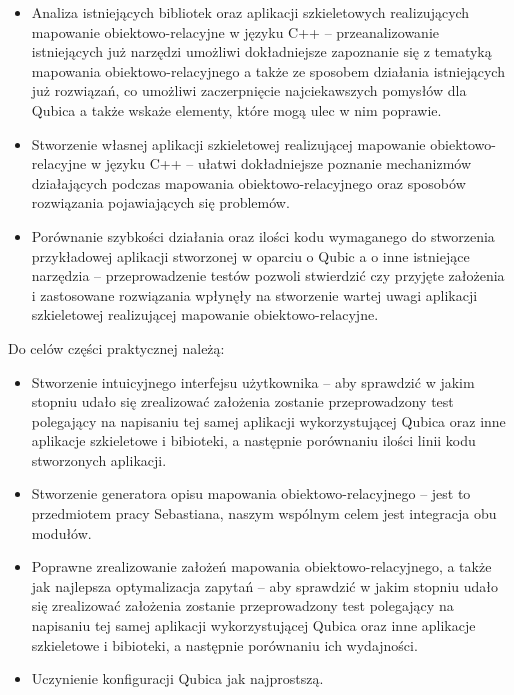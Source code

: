 \documentclass[12pt]{report}
\begin{document}
\begin{itemize}
\item Analiza istniejących bibliotek oraz aplikacji szkieletowych realizujących ma\-po\-wa\-nie obiektowo-relacyjne w języku C++ -- przeanalizowanie istniejących już narzędzi
umożliwi dokładniejsze zapoznanie się z tematyką mapowania obiektowo-relacyjnego a także ze sposobem działania istniejących już rozwiązań, co umożliwi zaczerpnięcie 
najciekawszych pomysłów dla Qubica a także wskaże elementy, które mogą ulec w nim poprawie.
\item Stworzenie własnej aplikacji szkieletowej realizującej mapowanie obiektowo-relacyjne w języku C++ -- ułatwi dokładniejsze poznanie mechanizmów dzia\-łających
podczas mapowania obiektowo-relacyjnego oraz sposobów ro\-zwią\-zania pojawiających się problemów.

\item Porównanie szybkości działania oraz ilości kodu wymaganego do stworzenia przykładowej aplikacji stworzonej w oparciu o Qubic a o inne istniejące na\-rzędzia -- 
przeprowadzenie testów pozwoli stwierdzić czy przyjęte założenia i zastosowane rozwiązania wpłynęły na stworzenie wartej uwagi aplikacji szkieletowej realizującej
mapowanie obiektowo-relacyjne.
\end{itemize}

Do celów części praktycznej należą:

\begin{itemize}
\item Stworzenie intuicyjnego interfejsu użytkownika -- aby sprawdzić w jakim stopniu udało się zrealizować założenia zostanie przeprowadzony test po\-le\-ga\-ją\-cy na 
napisaniu tej samej aplikacji wykorzystującej Qubica oraz inne aplikacje szkieletowe i bibioteki, a następnie porównaniu ilości linii kodu stworzonych aplikacji.
\item Stworzenie generatora opisu mapowania obiektowo-relacyjnego -- jest to przed\-mio\-tem pracy Sebastiana, naszym wspólnym celem jest integracja obu modułów.
\item Poprawne zrealizowanie założeń mapowania obiektowo-relacyjnego, a także jak najlepsza optymalizacja zapytań -- aby sprawdzić w jakim stopniu udało się zrealizować
założenia zostanie przeprowadzony test polegający na napisaniu tej samej aplikacji wykorzystującej Qubica oraz inne aplikacje szkieletowe i bibioteki, a następnie porównaniu
ich wydajności.
\item Uczynienie konfiguracji Qubica jak najprostszą.
\end{itemize}
\end{document}
